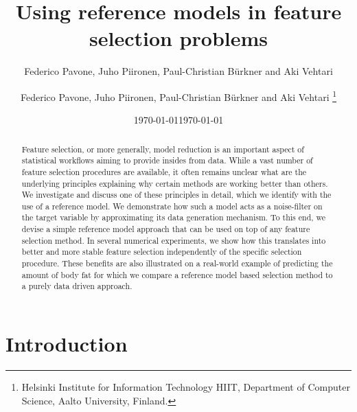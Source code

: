 \documentclass[american,]{article}
\title{Using reference models in feature selection problems 
	\vspace{.1in}}
\author{Federico Pavone, Juho Piironen, Paul-Christian B\"{u}rkner and Aki Vehtari}
\author{
    Federico Pavone, 
  Juho Piironen,
  Paul-Christian B\"{u}rkner
  and Aki Vehtari \footnote{Helsinki Institute for Information Technology HIIT,
  Department of Computer Science, Aalto University, Finland.}
  }
\date{\today}
\date{\today}
\theoremstyle{definition}
\begin{document}
\maketitle
\begin{abstract}

Feature selection, or more generally, model reduction is an important aspect of statistical workflows aiming to provide insides from data. While a vast number of feature selection procedures are available, it often remains unclear what are the underlying principles explaining why certain methods are working better than others. We investigate and discuss one of these principles in detail, which we identify with the use of a reference model. We demonstrate how such a model acts as a noise-filter on the target variable by approximating its data generation mechanism.
To this end, we devise a simple reference model approach that can be used on top of any feature selection method. In several numerical experiments, we show how this translates into better and more stable feature selection independently of the specific selection procedure. 
These benefits are also illustrated on a real-world example of predicting the amount of body fat for which we compare a reference model based selection method to a purely data driven approach.



\end{abstract}

\hypertarget{introduction}{%
\section{Introduction}\label{introduction}}
\end{document}
